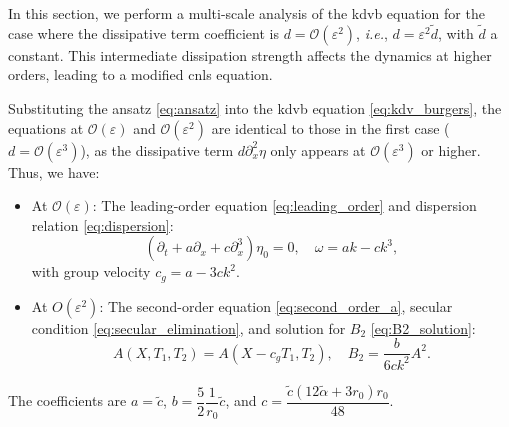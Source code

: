 \documentclass[alpha-refs, 12pt]{wiley-article}
\renewcommand{\O}{\mathcal{O}}
\newcommand{\eps}{\varepsilon}
\begin{document}
In this section, we perform a multi-scale analysis of the \acrshort{kdvb} equation for the case where the dissipative term coefficient is $d = \O(\eps^2)$, \emph{i.e.}, $d = \eps^2 \tilde{d}$, with $\tilde{d}$ a constant. This intermediate dissipation strength affects the dynamics at higher orders, leading to a modified \acrfull{cnls} equation. 

Substituting the ansatz \eqref{eq:ansatz} into the \acrshort{kdvb} equation \eqref{eq:kdv_burgers}, the equations at $\O(\eps)$ and $\O(\eps^2)$ are identical to those in the first case ($d = \O(\eps^3)$), as the dissipative term $d \partial_x^2 \eta$ only appears at $\O(\eps^3)$ or higher. Thus, we have:
\begin{itemize}
    \item At $\O(\eps)$: The leading-order equation \eqref{eq:leading_order} and dispersion relation \eqref{eq:dispersion}:
    \[
    \left( \partial_t + a \partial_x + c \partial_x^3 \right) \eta_0 = 0, \quad \omega = a k - c k^3,
    \]
    with group velocity $c_g = a - 3 c k^2$.
    \item At $O(\eps^2)$: The second-order equation \eqref{eq:second_order_a}, secular condition \eqref{eq:secular_elimination}, and solution for $B_2$ \eqref{eq:B2_solution}:
    \[
    A(X, T_1, T_2) = A(X - c_g T_1, T_2), \quad B_2 = \frac{b}{6 c k^2} A^2.
    \]
\end{itemize}
The coefficients are $a = \tilde{c}$, $b = \dfrac{5}{2} \dfrac{1}{r_0} \tilde{c}$, and $c = \dfrac{\tilde{c} (12 \tilde{\alpha} + 3 r_0) r_0}{48}$.
\end{document}
